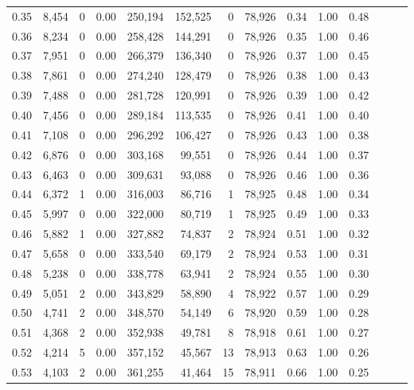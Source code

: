 \begin{tabular}{rrrrrrrrrrrrrr}
0.35 &  8,454 &      0 &  0.00 &  250,194 &  152,525 &       0 &  78,926 &  0.34 &  1.00 &      0.48 \\
0.36 &  8,234 &      0 &  0.00 &  258,428 &  144,291 &       0 &  78,926 &  0.35 &  1.00 &      0.46 \\
0.37 &  7,951 &      0 &  0.00 &  266,379 &  136,340 &       0 &  78,926 &  0.37 &  1.00 &      0.45 \\
0.38 &  7,861 &      0 &  0.00 &  274,240 &  128,479 &       0 &  78,926 &  0.38 &  1.00 &      0.43 \\
0.39 &  7,488 &      0 &  0.00 &  281,728 &  120,991 &       0 &  78,926 &  0.39 &  1.00 &      0.42 \\
0.40 &  7,456 &      0 &  0.00 &  289,184 &  113,535 &       0 &  78,926 &  0.41 &  1.00 &      0.40 \\
0.41 &  7,108 &      0 &  0.00 &  296,292 &  106,427 &       0 &  78,926 &  0.43 &  1.00 &      0.38 \\
0.42 &  6,876 &      0 &  0.00 &  303,168 &   99,551 &       0 &  78,926 &  0.44 &  1.00 &      0.37 \\
0.43 &  6,463 &      0 &  0.00 &  309,631 &   93,088 &       0 &  78,926 &  0.46 &  1.00 &      0.36 \\
0.44 &  6,372 &      1 &  0.00 &  316,003 &   86,716 &       1 &  78,925 &  0.48 &  1.00 &      0.34 \\
0.45 &  5,997 &      0 &  0.00 &  322,000 &   80,719 &       1 &  78,925 &  0.49 &  1.00 &      0.33 \\
0.46 &  5,882 &      1 &  0.00 &  327,882 &   74,837 &       2 &  78,924 &  0.51 &  1.00 &      0.32 \\
0.47 &  5,658 &      0 &  0.00 &  333,540 &   69,179 &       2 &  78,924 &  0.53 &  1.00 &      0.31 \\
0.48 &  5,238 &      0 &  0.00 &  338,778 &   63,941 &       2 &  78,924 &  0.55 &  1.00 &      0.30 \\
0.49 &  5,051 &      2 &  0.00 &  343,829 &   58,890 &       4 &  78,922 &  0.57 &  1.00 &      0.29 \\
0.50 &  4,741 &      2 &  0.00 &  348,570 &   54,149 &       6 &  78,920 &  0.59 &  1.00 &      0.28 \\
0.51 &  4,368 &      2 &  0.00 &  352,938 &   49,781 &       8 &  78,918 &  0.61 &  1.00 &      0.27 \\
0.52 &  4,214 &      5 &  0.00 &  357,152 &   45,567 &      13 &  78,913 &  0.63 &  1.00 &      0.26 \\
0.53 &  4,103 &      2 &  0.00 &  361,255 &   41,464 &      15 &  78,911 &  0.66 &  1.00 &      0.25 \\

\end{tabular}
